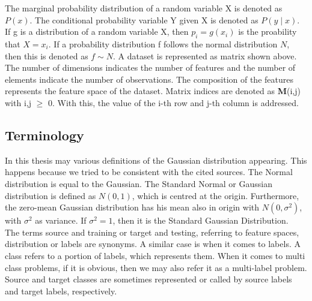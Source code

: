 The marginal probability distribution of a random variable X is denoted as $P(x)$.
The conditional probability variable Y given X is denoted as $P(y \mid x)$.
If g is a distribution of a random variable X, then $p_i=g(x_i)$ is the proability that $X=x_i$.
If a probability distribution f follows the normal distribution $N$, then this is denoted as $f\sim N$.\newline
A dataset is represented as matrix shown above.
The number of dimensions indicates the number of features and the number of elements indicate the number of observations.
The composition of the features represents the feature space of the dataset.
Matrix indices are denoted as \textbf{M}(i,j) with i,j $\ge$ 0.
With this, the value of the i-th row and j-th column is addressed.\newline
\subsection{Terminology}
In this thesis may various definitions of the Gaussian distribution appearing.
This happens because we tried to be consistent with the cited sources.
The Normal distribution is equal to the Gaussian.
The Standard Normal or Gaussian distribution is defined as $N(0,1)$, which is centred at the origin.
Furthermore, the zero-mean Gaussian distribution has his mean also in origin with $N(0,\sigma^2)$, with $\sigma^2$ as variance.
If $\sigma^2=1$, then it is the Standard Gaussian Distribution.\\
The terms source and training or target and testing, referring to feature spaces, distribution or labels are synonyms.
A similar case is when it comes to labels. A class refers to a portion of labels, which represents them. 
When it comes to multi class problems, if it is obvious, then we may also refer it as a multi-label problem.
Source and target classes are sometimes represented or called by source labels and target labels, respectively.
\clearpage
\newpage
